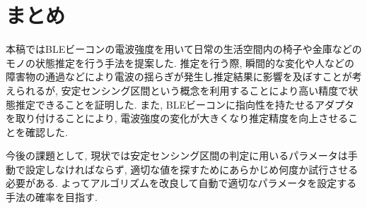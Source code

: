 \documentclass[Japanese]{dicomopapers}
\begin{document}
\section{まとめ}
本稿ではBLEビーコンの電波強度を用いて日常の生活空間内の椅子や金庫などのモノの状態推定を行う手法を提案した.
推定を行う際, 瞬間的な変化や人などの障害物の通過などにより電波の揺らぎが発生し推定結果に影響を及ぼすことが考えられるが, 安定センシング区間という概念を利用することにより高い精度で状態推定できることを証明した.
また, BLEビーコンに指向性を持たせるアダプタを取り付けることにより, 電波強度の変化が大きくなり推定精度を向上させることを確認した.

今後の課題として, 現状では安定センシング区間の判定に用いるパラメータは手動で設定しなければならず, 適切な値を探すためにあらかじめ何度か試行させる必要がある.
よってアルゴリズムを改良して自動で適切なパラメータを設定する手法の確率を目指す.


\end{document}
